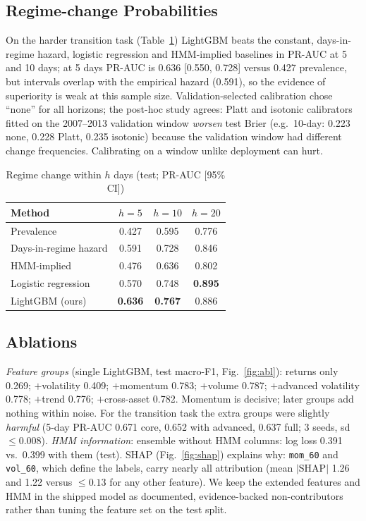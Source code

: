 \documentclass[conference]{IEEEtran}
\newcommand{\best}[1]{\textbf{#1}}
\begin{document}
\subsection{Regime-change Probabilities}
On the harder transition task (Table~\ref{tab:trans}) LightGBM beats the constant, days-in-regime hazard, logistic regression and HMM-implied baselines in PR-AUC at 5 and 10 days; at 5 days PR-AUC is 0.636 [0.550, 0.728] versus 0.427 prevalence, but intervals overlap with the empirical hazard (0.591), so the evidence of superiority is weak at this sample size. Validation-selected calibration chose ``none'' for all horizons; the post-hoc study agrees: Platt and isotonic calibrators fitted on the 2007--2013 validation window \emph{worsen} test Brier (e.g.\ 10-day: 0.223 none, 0.228 Platt, 0.235 isotonic) because the validation window had different change frequencies. Calibrating on a window unlike deployment can hurt.

\begin{table}[t]\caption{Regime change within $h$ days (test; PR-AUC [95\% CI])}\label{tab:trans}\centering\small
\begin{tabular}{lccc}\toprule Method & $h{=}5$ & $h{=}10$ & $h{=}20$\\\midrule
Prevalence & 0.427 & 0.595 & 0.776\\ Days-in-regime hazard & 0.591 & 0.728 & 0.846\\ HMM-implied & 0.476 & 0.636 & 0.802\\ Logistic regression & 0.570 & 0.748 & \best{0.895}\\ LightGBM (ours) & \best{0.636} & \best{0.767} & 0.886\\\bottomrule\end{tabular}\end{table}

\subsection{Ablations}
\emph{Feature groups} (single LightGBM, test macro-F1, Fig.~\ref{fig:abl}): returns only 0.269; $+$volatility 0.409; $+$momentum 0.783; $+$volume 0.787; $+$advanced volatility 0.778; $+$trend 0.776; $+$cross-asset 0.782. Momentum is decisive; later groups add nothing within noise. For the transition task the extra groups were slightly \emph{harmful} (5-day PR-AUC 0.671 core, 0.652 with advanced, 0.637 full; 3 seeds, sd $\le0.008$). \emph{HMM information}: ensemble without HMM columns: log loss 0.391 vs.\ 0.399 with them (test). SHAP (Fig.~\ref{fig:shap}) explains why: \texttt{mom\_60} and \texttt{vol\_60}, which define the labels, carry nearly all attribution (mean $|$SHAP$|$ 1.26 and 1.22 versus $\le0.13$ for any other feature). We keep the extended features and HMM in the shipped model as documented, evidence-backed non-contributors rather than tuning the feature set on the test split.
\end{document}

